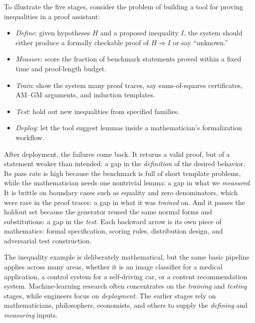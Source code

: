 To illustrate the five stages, consider the problem of building a tool for proving inequalities in a proof assistant:

\begin{itemize} 
  \item \emph{Define}: given hypotheses $H$ and a proposed inequality $I$, the system should either produce a formally checkable proof of $H\Rightarrow I$ or say ``unknown.'' 
  \item \emph{Measure}: score the fraction of benchmark statements proved within a fixed time and proof-length budget. 
  \item \emph{Train}: show the system many proof traces, say sums-of-squares certificates, AM--GM arguments, and induction templates. 
  \item \emph{Test}: hold out new inequalities from specified families. 
  \item \emph{Deploy}: let the tool  suggest lemmas inside a mathematician's formalization workflow. 
\end{itemize}

After deployment, the failures come back. It returns a valid proof, but of a statement weaker than intended: a gap in the \emph{definition} of the desired behavior. Its pass rate is high because the benchmark is full of short template problems, while the mathematician needs one nontrivial lemma: a gap in what we \emph{measured}. It is brittle on boundary cases such as equality and zero denominators, which were rare in the proof traces: a gap in what it was \emph{trained} on. And it passes the holdout set because the generator reused the same normal forms and substitutions: a gap in the \emph{test}. Each backward arrow is its own piece of mathematics: formal specification, scoring rules, distribution design, and adversarial test construction.

The inequality example is deliberately mathematical, but the same basic pipeline applies across many areas, whether it is an image classifier for a medical application, a control system for a self-driving car, or a content recommendation system. Machine-learning research often concentrates on the \emph{training} and \emph{testing} stages, while engineers focus on \emph{deployment}. The earlier stages rely on mathematicians, philosophers, economists, and others to supply the \emph{defining} and \emph{measuring} inputs. %

